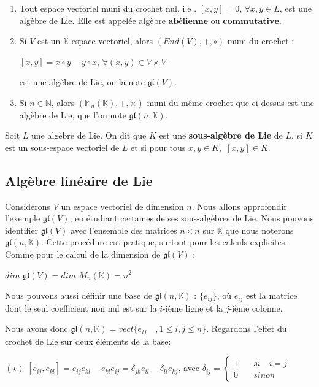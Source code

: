 \documentclass[a4paper,openany,12pt]{report}
\newcommand{\KK}{\mathbb{K}}
\newcommand{\NN}{\mathbb{N}}
\newcommand{\MM}{\mathbb{M}}
\newcommand{\gl}{\mathfrak{gl}}
\theoremstyle{break}
{\theorembodyfont{\upshape}
\newtheorem*{rmq}{Remarque :}
\newtheorem*{prv}{Preuve :}
\newtheorem*{ex}{Exemples :}
\newtheorem*{exe}{Exemple : }
\newtheorem*{nota}{Notation :}
\newtheorem*{dem}{D\'emonstration :}}
\begin{document}
\begin{ex}
\begin{enumerate}
\item Tout espace vectoriel muni du crochet nul, i.e . $[x,y]=0$, $\forall x,y \in L $, est une algèbre de Lie. Elle est appelée algèbre $\textbf{abélienne} $ ou $\textbf{commutative}$.

\item Si $V$ est un $\KK$-espace vectoriel,  alors $(End(V),+,\circ)$ muni du crochet : 
\begin{center}
$[x,y]=x \circ y-y \circ x$, $\forall (x,y) \in V \times V$
\end{center}
est une algèbre de Lie, on la note $\gl(V)$.

\item Si $ n \in \NN $, alors $(\MM_{n}(\KK),+,\times)$ muni du même crochet que ci-dessus est une algèbre de Lie, que l'on note $\gl(n,\KK)$.
\end{enumerate}
\end{ex}

\begin{df} 
\quad Soit $L$ une algèbre de Lie. On dit que $K$ est une \textbf{sous-algèbre de Lie} de $L$, si $K$ est un sous-espace vectoriel de $L$ et si pour tous $x , y \in K ,$ $[x,y] \in K$.
\end{df}

\subsection{Algèbre linéaire de Lie}\label{b}

Considérons $V$ un espace vectoriel de dimension $n$. Nous allons approfondir l'exemple $\gl(V)$, en étudiant certaines de ses sous-algèbres de Lie. Nous pouvons identifier $\gl(V)$  avec l'ensemble des matrices $n \times n$ sur $\KK$ que nous noterons $\gl(n,\KK)$. Cette procédure est pratique, surtout pour les calculs explicites. Comme pour le calcul de la dimension de $\gl(V)$ :
\begin{center}
$dim$ $\gl(V)= dim$ $M_{n}(\KK) = n^{2}$
\end{center}

Nous pouvons aussi définir une base de $\gl(n,\KK)$ : $ \{ e_{ij} \}$, où $e_{ij}$ est la matrice dont le seul coefficient non nul est sur la $i$-ième ligne et la $j$-ième colonne.
 
Nous avons donc $\gl(n,\KK)=vect\{ { e_{ij} \quad , 1\leq i , j \leq n }\}$. Regardons l'effet du crochet de Lie sur deux éléments de la base:
\begin{center}
$(\star)$ \quad $ [ e_{ij},e_{kl} ] = e_{ij} e_{kl} - e_{kl} e_{ij}  = \delta_{jk}e_{il}  -  \delta_{li}e_{kj} $, avec 
$ \delta_{ij} = \left \{
\begin{aligned}
1 & \quad si \quad i=j\\
0 & \quad sinon
\end{aligned}
\right. $
\end{center}
\end{document}
